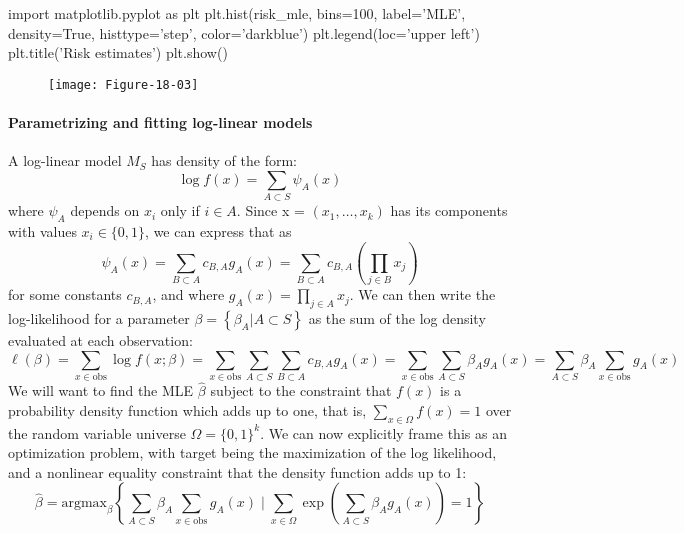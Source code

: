 \begin{python}
import matplotlib.pyplot as plt
plt.hist(risk_mle, bins=100, label='MLE', density=True, histtype='step', color='darkblue')
plt.legend(loc='upper left')
plt.title('Risk estimates')
plt.show()
\end{python}

\begin{figure}[H]
\centering
\texttt{[image: Figure-18-03]}
\end{figure}

\paragraph{Parametrizing and fitting log-linear models}\label{parametrizing-and-fitting-log-linear-models}
A log-linear model \(M_S\) has density of the form:
\[
\log f(x) = \sum_{A \subset S} \psi_A(x)
\]
where \(\psi_A\) depends on \(x_{i}\) only if \(i \in A\). Since x =
\((x_{1}, \dots, x_{k})\) has its components with values
\(x_{i} \in \{ 0, 1 \}\), we can express that as
\[
\psi_A(x) = \sum_{B \subset A} c_{B, A} g_A(x) = \sum_{B \subset A} c_{B, A} \left( \prod_{j \in B} x_{j} \right)
\]
for some constants \(c_{B, A}\), and where
\(g_A(x) = \prod_{j \in A} x_{j}\). We can then write the log-likelihood
for a parameter \(\beta = \left\{ \beta_A | A \subset S \right\}\) as
the sum of the log density evaluated at each observation:
\[
\ell(\beta) = \sum_{x \in \text{obs}} \log f(x; \beta) =  \sum_{x \in \text{obs}} \sum_{A \subset S} \sum_{B \subset A} c_{B, A} g_A(x) = \sum_{x \in \text{obs}} \sum_{A \subset S} \beta_A g_A(x) = \sum_{A \subset S} \beta_A \sum_{x \in \text{obs}} g_A(x)
\]
We will want to find the MLE \(\hat{\beta}\) subject to the constraint
that \(f(x)\) is a probability density function which adds up to one,
that is, \(\sum_{x \in \Omega} f(x) = 1\) over the random variable
universe \(\Omega = \{ 0, 1 \}^{k}\).
We can now explicitly frame this as an optimization problem, with target
being the maximization of the log likelihood, and a nonlinear equality
constraint that the density function adds up to 1:
\[
\hat{\beta} = \text{argmax}_\beta \left\{ \sum_{A \subset S} \beta_A \sum_{x \in \text{obs}} g_A(x) 
\;\Bigg|\;  \sum_{x \in \Omega} \exp \left( \sum_{A \subset S} \beta_A g_A(x) \right) = 1
\right\}
\]
